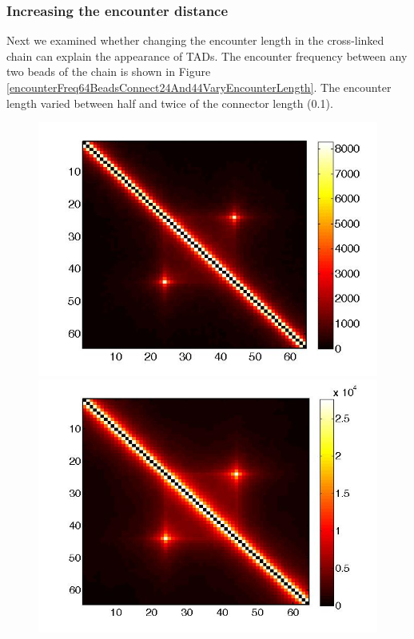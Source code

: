 \documentclass[12pt]{book}
\begin{document}
\subsubsection{Increasing the encounter distance}
Next we examined whether changing the encounter length in the cross-linked chain can explain the appearance of TADs. The encounter frequency between any two beads of the chain is shown in Figure \ref{encounterFreq64BeadsConnect24And44VaryEncounterLength}. The encounter length varied between half and twice of the connector length (0.1).

\begin{figure}[H]
\includegraphics[scale=0.2]{encounterFrequency64BeadsConnect24And44EncounterDist0_05}
\includegraphics[scale=0.19]{encounterFrequency64BeadsConnect24And44EncounterDist0_1}

\end{figure}
\end{document}
